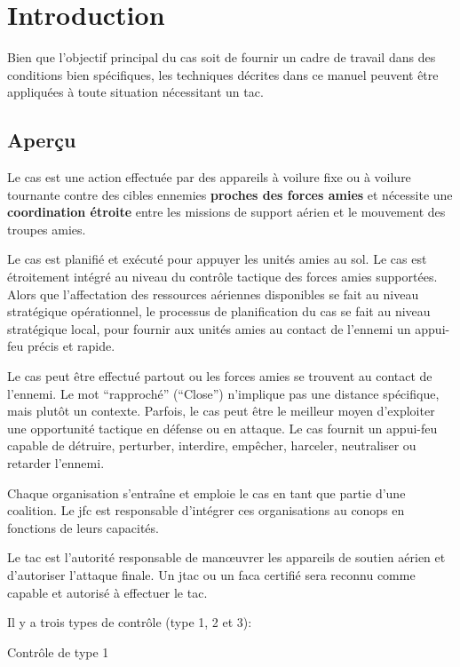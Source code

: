 \chapter{Introduction}

\begin{center}
\end{center}

\e
	
    \item 
	Bien que l'objectif principal du \gls{cas} soit de fournir un cadre de travail dans des conditions bien spécifiques, les techniques décrites dans ce manuel peuvent être appliquées à toute situation nécessitant un \gls{tac}.%
\ed

\section{Aperçu}

\e
    \item
    Le \gls{cas} est une action effectuée par des appareils à voilure fixe ou à voilure tournante contre des cibles ennemies \textbf{proches des forces amies} et nécessite une \textbf{coordination étroite} entre les missions de support aérien et le mouvement des troupes amies.
    \item
    Le \gls{cas} est planifié et exécuté pour appuyer les unités amies au sol. Le \gls{cas} est étroitement intégré au niveau du contrôle tactique des forces amies supportées. Alors que l'affectation des ressources aériennes disponibles se fait au niveau stratégique opérationnel, le processus de planification du \gls{cas} se fait au niveau stratégique local, pour fournir aux unités amies au contact de l'ennemi un appui-feu précis et rapide.
    \item
    Le \gls{cas} peut être effectué partout ou les forces amies se trouvent au contact de l'ennemi. Le mot ``rapproché'' (``Close'') n'implique pas une distance spécifique, mais plutôt un contexte. Parfois, le \gls{cas} peut être le meilleur moyen d'exploiter une opportunité tactique en défense ou en attaque. Le \gls{cas} fournit un appui-feu capable de détruire, perturber, interdire, empêcher, harceler, neutraliser ou retarder l'ennemi.
    \item
    Chaque organisation s'entraîne et emploie le \gls{cas} en tant que partie d'une coalition. Le \gls{jfc} est responsable d'intégrer ces organisations au \gls{conops} en fonctions de leurs capacités.
    \item
    Le \gls{tac} est l'autorité responsable de manœuvrer les appareils de soutien aérien et d'autoriser l'attaque finale. Un \gls{jtac} ou un \gls{faca} certifié sera reconnu comme capable et autorisé à effectuer le \gls{tac}.
    \item
    Il y a trois types de contrôle (type 1, 2 et 3):
    \ee
        \item
        Contrôle de type 1

